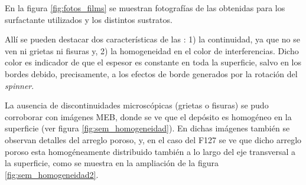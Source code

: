 	     En la figura \ref{fig:fotos_films} se muestran fotografías de las \pdm\space obtenidas para los surfactante utilizados y los distintos sustratos. 


		 Allí se pueden destacar dos características de las \pdm: 1) la continuidad, ya que no se ven ni grietas ni fisuras y, 2) la homogeneidad en el color de interferencias. Dicho color es indicador de que el espesor es constante en toda la superficie, salvo en los bordes debido, precisamente, a los efectos de borde generados por la rotación del \textit{spinner}\cite{Franssila2004,Jaeger2001}.

		 La ausencia de discontinuidades microscópicas (grietas o fisuras) se pudo corroborar con imágenes MEB, donde se ve que el depósito es homogéneo en la superficie (ver figura \ref{fig:sem_homogeneidad}). En dichas imágenes también se observan detalles del arreglo poroso, y, en el caso del F127 se ve que dicho arreglo poroso esta homogéneamente distribuido también a lo largo del eje transversal a la superficie, como se muestra en la ampliación de la figura \ref{fig:sem_homogeneidad2}.
		

